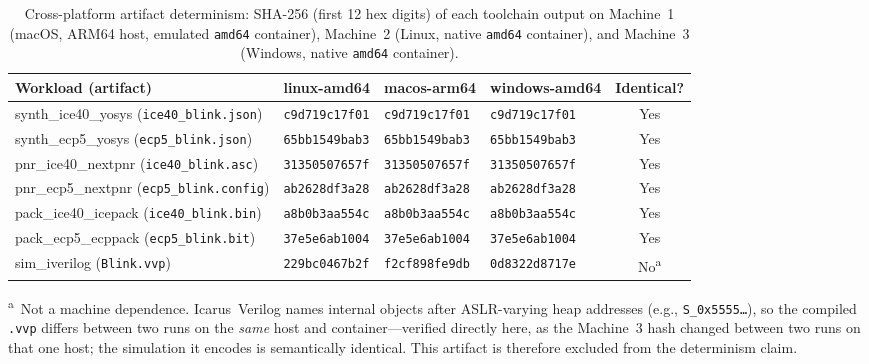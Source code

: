 \begin{table}[H]
    \caption{Cross-platform artifact determinism: SHA-256 (first 12 hex digits) of each toolchain output on Machine~1 (macOS, ARM64 host, emulated \texttt{amd64} container), Machine~2 (Linux, native \texttt{amd64} container), and Machine~3 (Windows, native \texttt{amd64} container).}
    \label{tab:determinism}
    \centering
    \small
    \setlength{\tabcolsep}{4pt}
    \begin{tabularx}{\textwidth}{@{} X l l l c @{}}
    \toprule
    \textbf{Workload (artifact)} & \textbf{linux-amd64} & \textbf{macos-arm64} & \textbf{windows-amd64} & \textbf{Identical?} \\
    \midrule
    synth\_ice40\_yosys (\texttt{ice40\_blink.json})   & \texttt{c9d719c17f01} & \texttt{c9d719c17f01} & \texttt{c9d719c17f01} & Yes \\
    synth\_ecp5\_yosys (\texttt{ecp5\_blink.json})     & \texttt{65bb1549bab3} & \texttt{65bb1549bab3} & \texttt{65bb1549bab3} & Yes \\
    pnr\_ice40\_nextpnr (\texttt{ice40\_blink.asc})    & \texttt{31350507657f} & \texttt{31350507657f} & \texttt{31350507657f} & Yes \\
    pnr\_ecp5\_nextpnr (\texttt{ecp5\_blink.config})   & \texttt{ab2628df3a28} & \texttt{ab2628df3a28} & \texttt{ab2628df3a28} & Yes \\
    pack\_ice40\_icepack (\texttt{ice40\_blink.bin})   & \texttt{a8b0b3aa554c} & \texttt{a8b0b3aa554c} & \texttt{a8b0b3aa554c} & Yes \\
    pack\_ecp5\_ecppack (\texttt{ecp5\_blink.bit})     & \texttt{37e5e6ab1004} & \texttt{37e5e6ab1004} & \texttt{37e5e6ab1004} & Yes \\
    sim\_iverilog (\texttt{Blink.vvp})                 & \texttt{229bc0467b2f} & \texttt{f2cf898fe9db} & \texttt{0d8322d8717e} & No\textsuperscript{a} \\
    \bottomrule
    \end{tabularx}
    \begin{flushleft}\scriptsize
    \textsuperscript{a}~Not a machine dependence. Icarus~Verilog names internal objects after ASLR-varying heap addresses (e.g., \texttt{S\_0x5555\ldots}), so the compiled \texttt{.vvp} differs between two runs on the \emph{same} host and container---verified directly here, as the Machine~3 hash changed between two runs on that one host; the simulation it encodes is semantically identical. This artifact is therefore excluded from the determinism claim.
    \end{flushleft}
\end{table}

